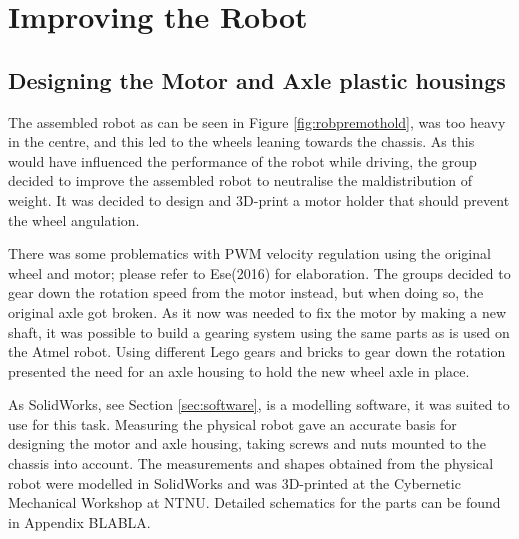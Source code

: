 \section{Improving the Robot}
\label{sec:improvements}

\subsection{Designing the Motor and Axle plastic housings}
The assembled robot as can be seen in Figure \ref{fig:robpremothold}, was too heavy in the centre, and this led to the wheels leaning towards the chassis. As this would have influenced the performance of the robot while driving, the group decided to improve the assembled robot to neutralise the maldistribution of weight. It was decided to design and 3D-print a motor holder that should prevent the wheel angulation.

There was some problematics with PWM velocity regulation using the original wheel and motor; please refer to Ese(2016) for elaboration. The groups decided to gear down the rotation speed from the motor instead, but when doing so, the original axle got broken. As it now was needed to fix the motor by making a new shaft, it was possible to build a gearing system using the same parts as is used on the Atmel robot. Using different Lego gears and bricks to gear down the rotation presented the need for an axle housing to hold the new wheel axle in place.

As SolidWorks, see Section \ref{sec:software}, is a modelling software, it was suited to use for this task. Measuring the physical robot gave an accurate basis for designing the motor and axle housing, taking screws and nuts mounted to the chassis into account. The measurements and shapes obtained from the physical robot were modelled in SolidWorks and was 3D-printed at the Cybernetic Mechanical Workshop at NTNU. Detailed schematics for the parts can be found in Appendix BLABLA. 



